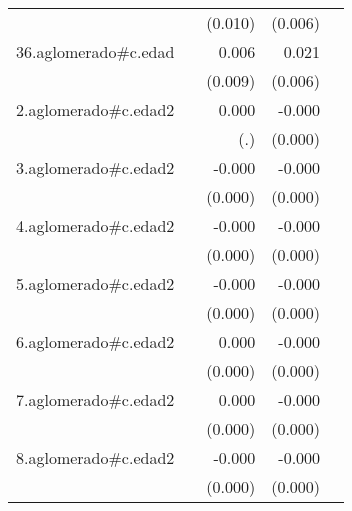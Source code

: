 {\begin{longtable}{l*{4}{D{.}{.}{-1}}}
            &                     &     (0.010)         &     (0.006)         &                     \\
\addlinespace
36.aglomerado#c.edad&                     &       0.006         &       0.021\sym{***}&                     \\
            &                     &     (0.009)         &     (0.006)         &                     \\
\addlinespace
2.aglomerado#c.edad2&                     &       0.000         &      -0.000         &                     \\
            &                     &         (.)         &     (0.000)         &                     \\
\addlinespace
3.aglomerado#c.edad2&                     &      -0.000         &      -0.000\sym{***}&                     \\
            &                     &     (0.000)         &     (0.000)         &                     \\
\addlinespace
4.aglomerado#c.edad2&                     &      -0.000         &      -0.000\sym{*}  &                     \\
            &                     &     (0.000)         &     (0.000)         &                     \\
\addlinespace
5.aglomerado#c.edad2&                     &      -0.000         &      -0.000         &                     \\
            &                     &     (0.000)         &     (0.000)         &                     \\
\addlinespace
6.aglomerado#c.edad2&                     &       0.000         &      -0.000         &                     \\
            &                     &     (0.000)         &     (0.000)         &                     \\
\addlinespace
7.aglomerado#c.edad2&                     &       0.000         &      -0.000\sym{*}  &                     \\
            &                     &     (0.000)         &     (0.000)         &                     \\
\addlinespace
8.aglomerado#c.edad2&                     &      -0.000         &      -0.000         &                     \\
            &                     &     (0.000)         &     (0.000)         &                     \\

\end{longtable}}
